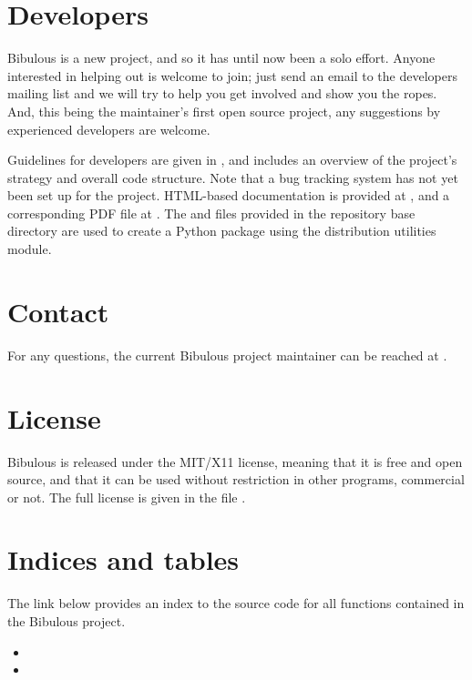 \documentclass[letterpaper,10pt,english]{sphinxmanual}
\begin{document}
\section{Developers}
\label{\detokenize{index:developers}}
Bibulous is a new project, and so it has until now been a solo effort. Anyone interested in helping out is welcome to join; just send an email to the developers mailing list and we will try to help you get involved and show you the ropes. And, this being the maintainer’s first open source project, any suggestions by experienced developers are welcome.

Guidelines for developers are given in , and includes an overview of the project’s strategy and overall code structure. Note that a bug tracking system has not yet been set up for the project. HTML-based documentation is provided at , and a corresponding PDF file at . The  and  files provided in the repository base directory are used to create a Python package using the  distribution utilities module.


\section{Contact}
\label{\detokenize{index:contact}}
For any questions, the current Bibulous project maintainer can be reached at .


\section{License}
\label{\detokenize{index:license}}
Bibulous is released under the MIT/X11 license, meaning that it is free and open source, and that it can be used without restriction in other programs, commercial or not. The full license is given in the file .


\section{Indices and tables}
\label{\detokenize{index:indices-and-tables}}
The link below provides an index to the source code for all functions contained in the Bibulous project.
\begin{itemize}
\item {} 

\item {} 

\end{itemize}
\end{document}
